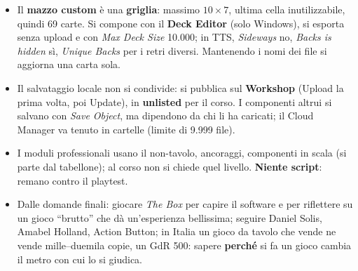 \begin{itemize}
        \emph{Modding} dei file installati, lavorando su una copia.
  \item Il \textbf{mazzo custom} è una \textbf{griglia}: massimo $10\times7$, ultima
        cella inutilizzabile, quindi 69 carte. Si compone con il \textbf{Deck Editor}
        (solo Windows), si esporta senza upload e con \emph{Max Deck Size} 10.000; in
        TTS, \emph{Sideways} no, \emph{Backs is hidden} sì, \emph{Unique Backs} per i
        retri diversi. Mantenendo i nomi dei file si aggiorna una carta sola.
  \item Il salvataggio locale non si condivide: si pubblica sul \textbf{Workshop}
        (Upload la prima volta, poi Update), in \textbf{unlisted} per il corso. I
        componenti altrui si salvano con \emph{Save Object}, ma dipendono da chi li ha
        caricati; il Cloud Manager va tenuto in cartelle (limite di 9.999 file).
  \item I moduli professionali usano il non-tavolo, ancoraggi, componenti in scala
        (si parte dal tabellone); al corso non si chiede quel livello. \textbf{Niente
        script}: remano contro il playtest.
  \item Dalle domande finali: giocare \emph{The Box} per capire il software e per
        riflettere su un gioco ``brutto'' che dà un'esperienza bellissima; seguire
        Daniel Solis, Amabel Holland, Action Button; in Italia un gioco da tavolo che
        vende ne vende mille--duemila copie, un GdR 500: sapere \textbf{perché} si fa
        un gioco cambia il metro con cui lo si giudica.
\end{itemize}
